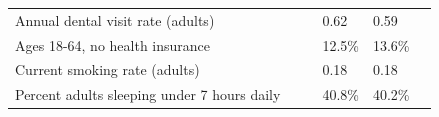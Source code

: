 \documentclass[9pt]{report}
\begin{document}
\begin{tabular}{p{.10in}p{.10in}p{.10in}p{3.7in}>{\hfill}p{.85in}>{\hfill}p{.85in}>{\hfill}p{.85in}>{\hfill}p{.85in}p{0.1in}}
\multicolumn{4}{l}{\parbox{3.6in}{\strut\raggedright{{Annual dental visit rate (adults)}}\strut}} &  &  & 0.62 & 0.59 & \multicolumn{1}{l}{}  \\ 
\multicolumn{4}{l}{\parbox{3.6in}{\strut\raggedright{{Ages 18-64, no health insurance}}\strut}} &  &  & 12.5\% & 13.6\% & \multicolumn{1}{l}{}  \\ 
\multicolumn{4}{l}{\parbox{3.6in}{\strut\raggedright{{Current smoking rate (adults)}}\strut}} &  &  & 0.18 & 0.18 & \multicolumn{1}{l}{}  \\ 
\multicolumn{4}{l}{\parbox{3.6in}{\strut\raggedright{{Percent adults sleeping under 7 hours daily}}\strut}} &  &  & 40.8\% & 40.2\% & \multicolumn{1}{l}{}  \\ 

\end{tabular}
\setlength{\tabcolsep}{6pt} %


\vspace{36pt}
\linespread{1.5}
\theendnotes
\end{document}
